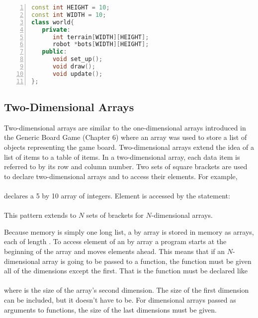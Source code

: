 \begin{minipage}{\textwidth}
\renewcommand*\thelstnumber{\the\value{lstnumber}c}
\begin{lstlisting}[language=C++,numbers = left,xleftmargin=4.0ex, basicstyle=\small, emph={HEIGHT,WIDTH,terrain,bots},emphstyle = \color{\mycolor},
showstringspaces=false,
caption = {The declaration of the \cf{world} class.},
label={listing:worldh}]
const int HEIGHT = 10;
const int WIDTH = 10;
class world{
   private:
      int terrain[WIDTH][HEIGHT];
      robot *bots[WIDTH][HEIGHT];
   public:
      void set_up();
      void draw();
      void update();
};
\end{lstlisting}
\end{minipage}

\subsection{Two-Dimensional Arrays}

Two-dimensional arrays are similar to the one-dimensional arrays introduced in the Generic Board Game (Chapter 6) where an array was used to store a list of  objects representing the game board.  Two-dimensional arrays extend the idea of a list of items to a table of items.  In a two-dimensional array, each data item is referred to by its row and column number.
Two sets of square brackets are used to declare two-dimensional arrays and to access their elements.    For example,\\
\\
declares a 5 by 10 array of integers.  Element  is accessed by the statement:\\
 \\
This pattern extends to $N$ sets of brackets for $N$-dimensional arrays.  

Because memory is simply one long list, a  by  array is stored in memory as   arrays, each of length .  To access element  of an  by  array a program starts at the beginning of the array and moves  elements ahead.   This means that if an $N$-dimensional array is going to be passed to a function, the function must be given all of the dimensions except the first.  That is the function must be declared like\\
 \\
where  is the size of the array's second dimension.  The size of the first dimension can be included, but it doesn't have to be.  For  dimensional arrays passed as arguments to functions, the size of the last  dimensions must be given.




